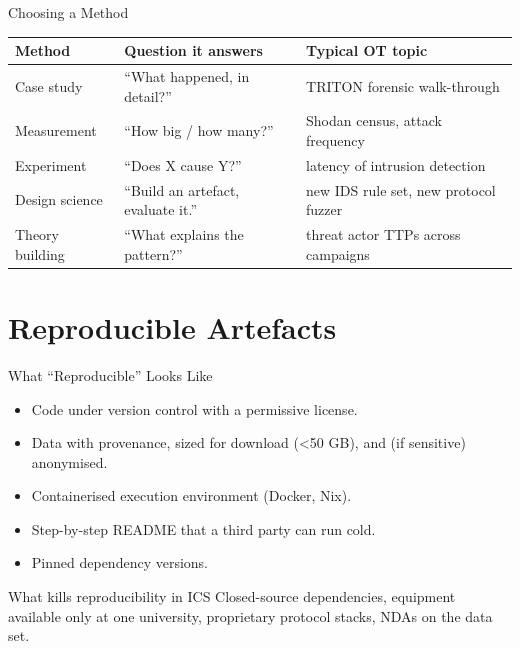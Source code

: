 \documentclass[aspectratio=169,11pt]{beamer}
\begin{document}
\begin{frame}{Choosing a Method}
\centering
\renewcommand{\arraystretch}{1.3}
\footnotesize
\setlength{\tabcolsep}{3pt}
\begin{tabular}{|p{2.8cm}|p{4.6cm}|p{4.8cm}|}
\hline
\rowcolor{slidePanel}
\textbf{Method} & \textbf{Question it answers} & \textbf{Typical OT topic} \\
\hline
Case study      & ``What happened, in detail?'' & TRITON forensic walk-through \\
Measurement     & ``How big / how many?''       & Shodan census, attack frequency \\
Experiment      & ``Does X cause Y?''           & latency of intrusion detection \\
Design science  & ``Build an artefact, evaluate it.'' & new IDS rule set, new protocol fuzzer \\
Theory building & ``What explains the pattern?'' & threat actor TTPs across campaigns \\
\hline
\end{tabular}
\end{frame}

\section{Reproducible Artefacts}

\begin{frame}{What ``Reproducible'' Looks Like}
\begin{itemize}
  \item Code under version control with a permissive license.
  \item Data with provenance, sized for download (\textless 50 GB), and (if sensitive) anonymised.
  \item Containerised execution environment (Docker, Nix).
  \item Step-by-step README that a third party can run cold.
  \item Pinned dependency versions.
\end{itemize}
\begin{importantbox}{What kills reproducibility in ICS}
Closed-source dependencies, equipment available only at one university, proprietary protocol stacks, NDAs on the data set.
\end{importantbox}
\end{frame}
\end{document}
